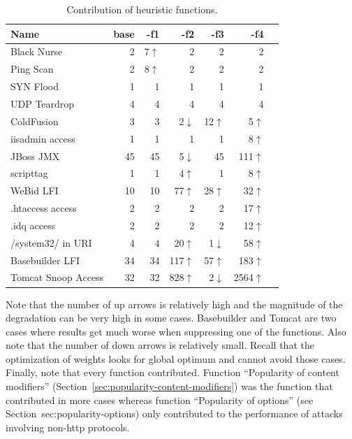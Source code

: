 \documentclass[conference]{IEEEtran}
\begin{document}
\setlength{\tabcolsep}{8pt}
\begin{table}[h!]
  \footnotesize
  \caption{\label{table:weights}Contribution of heuristic functions.}
  \vspace{-2ex}
  \centering
  \begin{tabular}{lrrrrrr}
    \toprule
    Name &
    base &
    -f1 &
    -f2 &    
    -f3 &
    -f4 \\
    \midrule
    Black Nurse & 2 & 7$\uparrow$ & 2 & 2 & 2 \\    
    Ping Scan & 2 &  8$\uparrow$& 2 & 2 & 2 \\
    SYN Flood & 1 & 1 & 1 & 1 & 1 \\
    UDP Teardrop & 4 & 4 & 4 & 4 & 4 \\
    \midrule
    ColdFusion & 3 & 3 & 2\cellcolor{lightgray}$\downarrow$ & 12$\uparrow$ & 5$\uparrow$ \\
    iisadmin access & 1  & 1 & 1 & 1 & 8$\uparrow$\\        
    JBoss JMX & 45 & 45 & 5\cellcolor{lightgray}$\downarrow$ & 45 & 111$\uparrow$ \\
    scripttag & 1 & 1 & 4$\uparrow$ & 1 & 8$\uparrow$ \\
    WeBid LFI & 10 & 10 & 77$\uparrow$ & 28$\uparrow$ & 32$\uparrow$ \\    
    .htaccess access & 2  & 2 & 2 & 2 & 17$\uparrow$\\
    .idq access & 2  & 2 & 2 & 2 & 12$\uparrow$ \\
    /system32/ in URI & 4  & 4 & 20$\uparrow$ & 1\cellcolor{lightgray}$\downarrow$ & 58$\uparrow$\\
    Basebuilder LFI & 34  & 34 & 117$\uparrow$ & 57$\uparrow$ & 183$\uparrow$\\
    Tomcat Snoop Access & 32  & 32 & 828$\uparrow$ & 2\cellcolor{lightgray}$\downarrow$ & 2564$\uparrow$\\
    \bottomrule
  \end{tabular}
\end{table}

Note that the number of up arrows is relatively high and the magnitude
of the degradation can be very high in some cases. Basebuilder and
Tomcat are two cases where results get much worse when suppressing one
of the functions. Also note that the number of down arrows is
relatively small. Recall that the optimization of weights looks for
global optimum and cannot avoid those cases. Finally, note that every
function contributed. Function ``Popularity of content modifiers''
(Section~\ref{sec:popularity-content-modifiers}) was the function that
contributed in more cases whereas function ``Popularity of options''
(see Section~{sec:popularity-options}) only contributed to the
performance of attacks involving non-http protocols.
\end{document}
